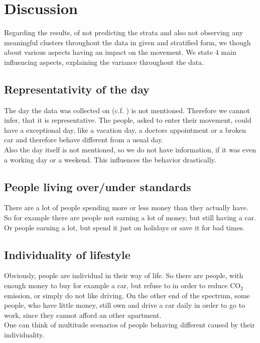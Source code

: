 	\section{Discussion} \label{sec: discussion}
	Regarding the results, of not predicting the strata and also not observing any meaningful clusters throughout the data in given and stratified form, we though about various aspects having an impact on the movement. We state 4 main influencing aspects, explaining the variance throughout the data.
	
	\subsection{Representativity of the day}
	The day the data was collected on (c.f. ) is not mentioned. Therefore we cannot infer, that it is representative. The people, asked to enter their movement, could have a exceptional day, like a vacation day, a doctors appointment or a broken car and therefore behave different from a usual day. \\
	Also the day itself is not mentioned, so we do not have information, if it was even a working day or a weekend. This influences the behavior drastically.
	
	\subsection{People living over/under standards}
	There are a lot of people spending more or less money than they actually have. So for example there are people not earning a lot of money, but still having a car. Or people earning a lot, but spend it just on holidays or save it for bad times.
	

	\subsection{Individuality of lifestyle}
	Obviously, people are individual in their way of life. So there are people, with enough money to buy for example a car, but refuse to in order to reduce CO$_2$ emission, or simply do not like driving. On the other end of the spectrum, some people, who have little money, still own and drive a car daily in order to go to work, since they cannot afford an other apartment.\\
	One can think of multitude scenarios of people behaving different caused by their individuality.
	
